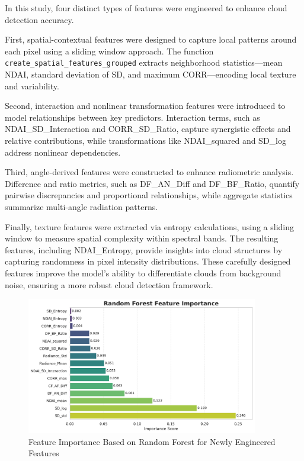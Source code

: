 \documentclass[11pt,letterpaper]{article}
\begin{document}
In this study, four distinct types of features were engineered to enhance cloud detection accuracy. 

First, spatial-contextual features were designed to capture local patterns around each pixel using a sliding window approach. The function \texttt{create\_spatial\_features\_grouped} extracts neighborhood statistics—mean NDAI, standard deviation of SD, and maximum CORR—encoding local texture and variability. 

Second, interaction and nonlinear transformation features were introduced to model relationships between key predictors. Interaction terms, such as NDAI\_SD\_Interaction and CORR\_SD\_Ratio, capture synergistic effects and relative contributions, while transformations like NDAI\_squared and SD\_log address nonlinear dependencies. 

Third, angle-derived features were constructed to enhance radiometric analysis. Difference and ratio metrics, such as DF\_AN\_Diff and DF\_BF\_Ratio, quantify pairwise discrepancies and proportional relationships, while aggregate statistics summarize multi-angle radiation patterns. 

Finally, texture features were extracted via entropy calculations, using a sliding window to measure spatial complexity within spectral bands. The resulting features, including NDAI\_Entropy, provide insights into cloud structures by capturing randomness in pixel intensity distributions. These carefully designed features improve the model’s ability to differentiate clouds from background noise, ensuring a more robust cloud detection framework.

\begin{figure}[H]
    \centering
    \includegraphics[width=0.9\textwidth]{figs/fe3.pdf}
    \caption{Feature Importance Based on Random Forest for Newly Engineered Features}
    \label{fig:fe3}
\end{figure}\noindent
\end{document}
